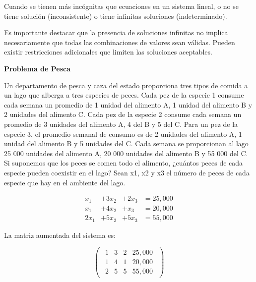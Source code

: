 \documentclass{article}
\begin{document}
\begin{tcolorbox}[colback=green!20!white,colframe=green!80!black,title=Soluciones en un Sistema con más Incógnitas que Ecuaciones]
    Cuando se tienen más incógnitas que ecuaciones en un sistema lineal, o no se tiene solución (inconsistente) o tiene infinitas soluciones (indeterminado).

    Es importante destacar que la presencia de soluciones infinitas no implica necesariamente que todas las combinaciones de valores sean válidas. Pueden existir restricciones adicionales que limiten las soluciones aceptables.
\end{tcolorbox}

\begin{large}
    \textbf{Problema de Pesca}
\end{large}

Un departamento de pesca y caza del estado proporciona tres tipos de comida a un lago que alberga a tres especies de peces. Cada pez de la especie 1 consume cada semana un promedio de 1 unidad del alimento A, 1 unidad del alimento B y 2 unidades del alimento C. Cada pez de la especie 2 consume cada semana un promedio de 3 unidades del alimento A, 4 del B y 5 del C. Para un pez de la especie 3, el promedio semanal de consumo es de 2 unidades del alimento A, 1 unidad del alimento B y 5 unidades del C. Cada semana se proporcionan al lago 25 000 unidades del alimento A, 20 000 unidades del alimento B y 55 000 del C. Si suponemos que los peces se comen todo el alimento, ¿cuántos peces de cada especie pueden coexistir en el lago? Sean x1, x2 y x3 el número de peces de cada especie que hay en el ambiente del lago.

\begin{equation*}
    \begin{aligned}
        x_1 &+ 3x_2 &+ 2x_3 &= 25,000\\
        x_1 &+ 4x_2 &+ x_3 &= 20,000\\
        2x_1 &+ 5x_2 &+ 5x_3 &= 55,000
    \end{aligned}
\end{equation*}

La matriz aumentada del sistema es:

\begin{equation*}
    \begin{pmatrix}
        \begin{array}{rrr|r}
            1 & 3 & 2 & 25,000\\
            1 & 4 & 1 & 20,000 \\
            2 & 5 & 5 & 55,000
        \end{array}
    \end{pmatrix}
\end{equation*}
\end{document}
